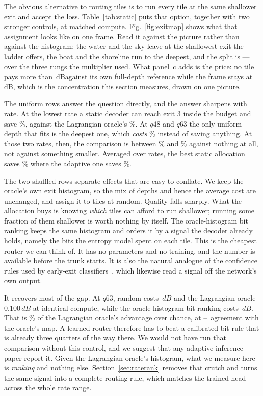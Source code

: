 \documentclass[10pt,twocolumn,letterpaper]{article}
\newcommand{\dB}{\,dB}
\begin{document}
The obvious alternative to routing tiles is to run every tile at the same
shallower exit and accept the loss. Table~\ref{tab:static} puts that option,
together with two stronger controls, at matched compute. Fig.~\ref{fig:exitmap} shows what that assignment looks like on one frame.
Read it against the picture rather than against the histogram: the water and
the sky leave at the shallowest exit the ladder offers, the boat and the
shoreline run to the deepest, and the split is \SplitShallow--\SplitMid--\SplitDeep
over the three rungs the multiplier used. What panel~c adds is the price: no
tile pays more than \ExitmapWorst\dB against its own full-depth reference while
the frame stays at \ExitmapFrame\dB, which is the concentration this section
measures, drawn on one picture.

The uniform rows answer the question directly, and the answer sharpens with rate.
At the lowest rate a static decoder can reach exit 3 inside the budget and save
\UniformThreeLow\%, against the Lagrangian oracle's \MainLowRate\%. At $q48$ and
$q63$ the only uniform depth that fits is the deepest one, which \emph{costs}
\DeepestUniformCost\% instead of saving anything. At those two rates, then, the
comparison is between \OracleAtFortyEight\% and \OracleAtSixtyThree\% against
nothing at all, not against something smaller. Averaged over
rates, the best static allocation saves \BestStaticMean\% where the adaptive one
saves \MainMean\%.

The two shuffled rows separate effects that are easy to conflate. We keep the
oracle's own exit histogram, so the mix of depths and hence the average cost are
unchanged, and assign it to tiles at random. Quality falls sharply. What the
allocation buys is knowing \emph{which} tiles can afford to run shallower;
running some fraction of them shallower is worth nothing by itself. The
oracle-histogram bit ranking keeps the same histogram and orders it by a signal the decoder
already holds, namely the bits the entropy model spent on each tile. This is the
cheapest router we can think of. It has no parameters and no training, and the
number is available before the trunk starts. It is also the natural analogue of
the confidence rules used by early-exit classifiers~\cite{branchynet,msdnet},
which likewise read a signal off the network's own output.

It recovers most of the gap. At $q63$, random costs \RandomDb$\dB$ and the
Lagrangian oracle $0.100\dB$ at identical compute, while the oracle-histogram bit ranking costs
\RateRankDb$\dB$. That is \RateRankRecovers\% of the Lagrangian oracle's advantage over
chance, at \HistAgreeLo--\HistAgreeHi\ agreement with the oracle's map. A learned router
therefore has to beat a calibrated bit rule that is already three quarters of the way
there. We would not have run that comparison without this control, and we
suggest that any adaptive-inference paper report it. Given the Lagrangian oracle's
histogram, what we measure here is \emph{ranking} and nothing else.
Section~\ref{sec:raterank} removes that crutch and turns the same signal into a
complete routing rule, which matches the trained head across the whole rate
range.
\end{document}
